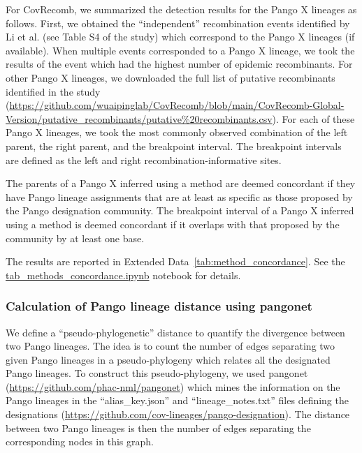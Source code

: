 \documentclass[12pt]{article}
\newcommand{\edref}[1]{Extended Data~\ref{#1}}
\begin{document}
For CovRecomb, we summarized the detection results for the Pango X lineages as follows.
First, we obtained the ``independent'' recombination events
identified by Li et al.\cite{Li2024CovRecomb} (see Table S4 of the study)
which correspond to the Pango X lineages (if available).
When multiple events corresponded to a Pango X lineage,
we took the results of the event which had the highest number of epidemic recombinants.
For other Pango X lineages, we downloaded the full list of putative recombinants
identified in the study
(\url{https://github.com/wuaipinglab/CovRecomb/blob/main/CovRecomb-Global-Version/putative\_recombinants/putative\%20recombinants.csv}).
For each of these Pango X lineages,
we took the most commonly observed combination of
the left parent, the right parent, and the breakpoint interval.
The breakpoint intervals are defined as the left and right recombination-informative sites.

The parents of a Pango X inferred using a method are deemed concordant
if they have Pango lineage assignments
that are at least as specific as those proposed by the Pango designation community.
The breakpoint interval of a Pango X inferred using a method is deemed concordant
if it overlaps with that proposed by the community by at least one base.

The results are reported in \edref{tab:method_concordance}.
See the
\href{https://github.com/jeromekelleher/sc2ts-paper/blob/main/notebooks/tab\_methods\_concordance.ipynb}{tab\_methods\_concordance.ipynb}
notebook for details.

\subsubsection*{Calculation of Pango lineage distance using pangonet}

We define a ``pseudo-phylogenetic'' distance
to quantify the divergence between two Pango lineages.
The idea is to count the number of edges
separating two given Pango lineages in a pseudo-phylogeny
which relates all the designated Pango lineages.
To construct this pseudo-phylogeny, we used
pangonet (\url{https://github.com/phac-nml/pangonet})
which mines the information on the Pango lineages
in the ``alias\_key.json'' and ``lineage\_notes.txt'' files
defining the designations
(\url{https://github.com/cov-lineages/pango-designation}).
The distance between two Pango lineages is then the number of edges
separating the corresponding nodes in this graph.
\end{document}
